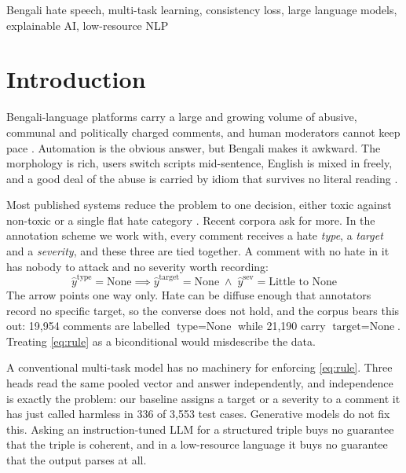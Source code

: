 \documentclass[conference]{IEEEtran}
\begin{document}
\begin{IEEEkeywords}
Bengali hate speech, multi-task learning, consistency loss, large language models, explainable AI, low-resource NLP
\end{IEEEkeywords}

\section{Introduction}
Bengali-language platforms carry a large and growing volume of abusive, communal and politically charged comments, and human moderators cannot keep pace \cite{islam2021bangla, romim2022bdshs}. Automation is the obvious answer, but Bengali makes it awkward. The morphology is rich, users switch scripts mid-sentence, English is mixed in freely, and a good deal of the abuse is carried by idiom that survives no literal reading \cite{romero2019bengali, sazzed2021vulgarity}.

Most published systems reduce the problem to one decision, either toxic against non-toxic or a single flat hate category \cite{romero2021hate, karim2020deephateexplainer}. Recent corpora ask for more. In the annotation scheme we work with, every comment receives a hate \emph{type}, a \emph{target} and a \emph{severity}, and these three are tied together. A comment with no hate in it has nobody to attack and no severity worth recording:
\begin{equation}
\hat{y}^{\text{type}} = \text{None} \implies \hat{y}^{\text{target}} = \text{None} \;\wedge\; \hat{y}^{\text{sev}} = \text{Little to None}
\label{eq:rule}
\end{equation}
The arrow points one way only. Hate can be diffuse enough that annotators record no specific target, so the converse does not hold, and the corpus bears this out: 19{,}954 comments are labelled $\text{type}=\text{None}$ while 21{,}190 carry $\text{target}=\text{None}$. Treating \eqref{eq:rule} as a biconditional would misdescribe the data.

A conventional multi-task model has no machinery for enforcing \eqref{eq:rule}. Three heads read the same pooled vector and answer independently, and independence is exactly the problem: our baseline assigns a target or a severity to a comment it has just called harmless in 336 of 3{,}553 test cases. Generative models do not fix this. Asking an instruction-tuned LLM for a structured triple buys no guarantee that the triple is coherent, and in a low-resource language it buys no guarantee that the output parses at all.
\end{document}
